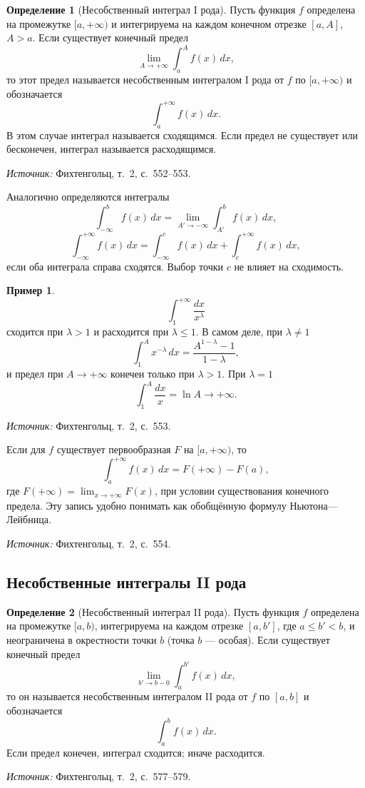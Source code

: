 \documentclass[12pt,a4paper]{article}
\newcommand{\source}[1]{\par\noindent\textit{Источник:} #1.}
\theoremstyle{definition}
\newtheorem{definition}{Определение}[section]
\newtheorem{example}{Пример}[section]
\theoremstyle{plain}
\theoremstyle{remark}
\begin{document}
\begin{definition}[Несобственный интеграл I рода]
Пусть функция \(f\) определена на промежутке \([a,+\infty)\) и интегрируема на каждом конечном отрезке \([a,A]\), \(A>a\). Если существует конечный предел
\[
\lim_{A\to+\infty}\int_a^A f(x)\,dx,
\]
то этот предел называется несобственным интегралом I рода от \(f\) по \([a,+\infty)\) и обозначается
\[
\int_a^{+\infty}f(x)\,dx.
\]
В этом случае интеграл называется сходящимся. Если предел не существует или бесконечен, интеграл называется расходящимся.
\end{definition}
\source{Фихтенгольц, т.~2, с.~552--553}

Аналогично определяются интегралы
\[
\int_{-\infty}^b f(x)\,dx=\lim_{A'\to-\infty}\int_{A'}^b f(x)\,dx,
\]
\[
\int_{-\infty}^{+\infty}f(x)\,dx
=
\int_{-\infty}^c f(x)\,dx+\int_c^{+\infty}f(x)\,dx,
\]
если оба интеграла справа сходятся. Выбор точки \(c\) не влияет на сходимость.

\begin{example}
\[
\int_1^{+\infty}\frac{dx}{x^\lambda}
\]
сходится при \(\lambda>1\) и расходится при \(\lambda\le 1\). В самом деле, при \(\lambda\ne1\)
\[
\int_1^A x^{-\lambda}\,dx=\frac{A^{1-\lambda}-1}{1-\lambda},
\]
и предел при \(A\to+\infty\) конечен только при \(\lambda>1\). При \(\lambda=1\)
\[
\int_1^A\frac{dx}{x}=\ln A\to+\infty.
\]
\end{example}
\source{Фихтенгольц, т.~2, с.~553}

Если для \(f\) существует первообразная \(F\) на \([a,+\infty)\), то
\[
\int_a^{+\infty}f(x)\,dx=F(+\infty)-F(a),
\]
где \(F(+\infty)=\lim_{x\to+\infty}F(x)\), при условии существования конечного предела. Эту запись удобно понимать как обобщённую формулу Ньютона—Лейбница.
\source{Фихтенгольц, т.~2, с.~554}

\subsection{Несобственные интегралы II рода}
\label{sec:II}

\begin{definition}[Несобственный интеграл II рода]
Пусть функция \(f\) определена на промежутке \([a,b)\), интегрируема на каждом отрезке \([a,b']\), где \(a\le b'<b\), и неограничена в окрестности точки \(b\) (точка \(b\) — особая). Если существует конечный предел
\[
\lim_{b'\to b-0}\int_a^{b'}f(x)\,dx,
\]
то он называется несобственным интегралом II рода от \(f\) по \([a,b]\) и обозначается
\[
\int_a^b f(x)\,dx.
\]
Если предел конечен, интеграл сходится; иначе расходится.
\end{definition}
\source{Фихтенгольц, т.~2, с.~577--579}
\end{document}
